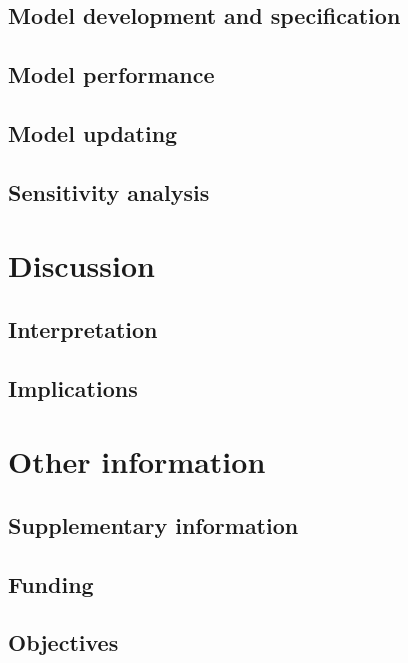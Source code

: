 \documentclass[
  letterpaper,
  DIV=11,
  numbers=noendperiod]{scrartcl}
\begin{document}
\subsection{Model development and
specification}\label{model-development-and-specification}

\subsection{Model performance}\label{model-performance}

\subsection{Model updating}\label{model-updating}

\subsection{Sensitivity analysis}\label{sensitivity-analysis-1}

\section{Discussion}\label{discussion}

\subsection{Interpretation}\label{interpretation}

\subsection{Implications}\label{implications}

\section{Other information}\label{other-information}

\subsection{Supplementary information}\label{supplementary-information}

\subsection{Funding}\label{funding}

\subsection{Objectives}\label{objectives}
\end{document}
